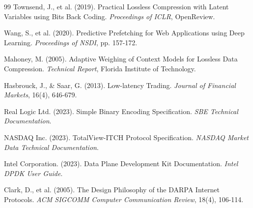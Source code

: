 \documentclass[12pt,a4paper]{article}
\begin{document}
\begin{thebibliography}{99}
Townsend, J., et al. (2019). Practical Lossless Compression with Latent Variables using Bits Back Coding. \textit{Proceedings of ICLR}, OpenReview.

Wang, S., et al. (2020). Predictive Prefetching for Web Applications using Deep Learning. \textit{Proceedings of NSDI}, pp. 157-172.

Mahoney, M. (2005). Adaptive Weighing of Context Models for Lossless Data Compression. \textit{Technical Report}, Florida Institute of Technology.

Hasbrouck, J., \& Saar, G. (2013). Low-latency Trading. \textit{Journal of Financial Markets}, 16(4), 646-679.

Real Logic Ltd. (2023). Simple Binary Encoding Specification. \textit{SBE Technical Documentation}.

NASDAQ Inc. (2023). TotalView-ITCH Protocol Specification. \textit{NASDAQ Market Data Technical Documentation}.

Intel Corporation. (2023). Data Plane Development Kit Documentation. \textit{Intel DPDK User Guide}.

Clark, D., et al. (2005). The Design Philosophy of the DARPA Internet Protocols. \textit{ACM SIGCOMM Computer Communication Review}, 18(4), 106-114.


\end{thebibliography}
\end{document}
